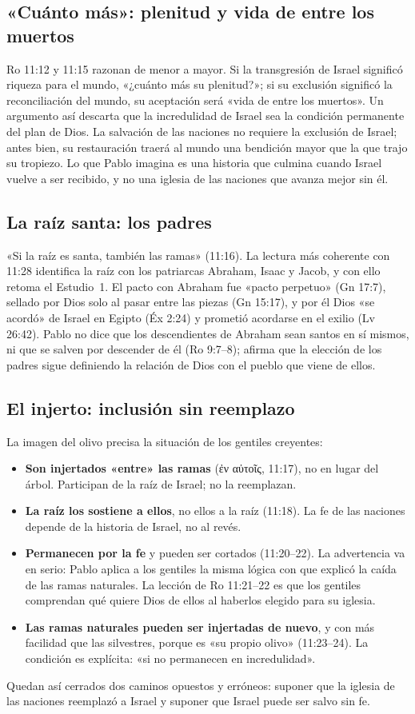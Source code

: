\documentclass[11pt,letterpaper]{article}
\newcommand{\grc}[1]{\foreignlanguage{ancientgreek}{#1}}
\begin{document}
\subsection{«Cuánto más»: plenitud y vida de entre los muertos}
Ro 11:12 y 11:15 razonan de menor a mayor. Si la transgresión de Israel significó riqueza para el mundo, «¿cuánto más su plenitud?»; si su exclusión significó la reconciliación del mundo, su aceptación será «vida de entre los muertos». Un argumento así descarta que la incredulidad de Israel sea la condición permanente del plan de Dios. La salvación de las naciones no requiere la exclusión de Israel; antes bien, su restauración traerá al mundo una bendición mayor que la que trajo su tropiezo. Lo que Pablo imagina es una historia que culmina cuando Israel vuelve a ser recibido, y no una iglesia de las naciones que avanza mejor sin él.

\subsection{La raíz santa: los padres}
«Si la raíz es santa, también las ramas» (11:16). La lectura más coherente con 11:28 identifica la raíz con los patriarcas Abraham, Isaac y Jacob, y con ello retoma el Estudio~1. El pacto con Abraham fue «pacto perpetuo» (Gn 17:7), sellado por Dios solo al pasar entre las piezas (Gn 15:17), y por él Dios «se acordó» de Israel en Egipto (Éx 2:24) y prometió acordarse en el exilio (Lv 26:42). Pablo no dice que los descendientes de Abraham sean santos en sí mismos, ni que se salven por descender de él (Ro 9:7--8); afirma que la elección de los padres sigue definiendo la relación de Dios con el pueblo que viene de ellos.

\subsection{El injerto: inclusión sin reemplazo}
La imagen del olivo precisa la situación de los gentiles creyentes:
\begin{itemize}
\item \textbf{Son injertados «entre» las ramas} (\grc{ἐν αὐτοῖς}, 11:17), no en lugar del árbol. Participan de la raíz de Israel; no la reemplazan.
\item \textbf{La raíz los sostiene a ellos}, no ellos a la raíz (11:18). La fe de las naciones depende de la historia de Israel, no al revés.
\item \textbf{Permanecen por la fe} y pueden ser cortados (11:20--22). La advertencia va en serio: Pablo aplica a los gentiles la misma lógica con que explicó la caída de las ramas naturales. La lección de Ro 11:21--22 es que los gentiles comprendan qué quiere Dios de ellos al haberlos elegido para su iglesia.
\item \textbf{Las ramas naturales pueden ser injertadas de nuevo}, y con más facilidad que las silvestres, porque es «su propio olivo» (11:23--24). La condición es explícita: «si no permanecen en incredulidad».
\end{itemize}
Quedan así cerrados dos caminos opuestos y erróneos: suponer que la iglesia de las naciones reemplazó a Israel y suponer que Israel puede ser salvo sin fe.
\end{document}
